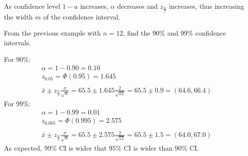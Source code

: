 \documentclass[letterpaper,12pt,fleqn]{article}
\renewcommand{\a}{\alpha}
\renewcommand{\o}{\sigma}
\newcommand{\z}[1]{z_{#1}}
\newcommand{\zdt}{\z{\frac{\a}{2}}}
\renewcommand{\P}{\Phi}
\begin{document}
As confidence level \(1-a\) increases, \(\a\) decreases and \(\zdt\) increases, thus increasing the width \(m\) of the
confidence interval.

\begin{example}
  From the previous example with \(n=12\), find the 90\% and 99\% confidence intervals.

  For 90\%:
  \begin{gather*}
    \a=1-0.90=0.10 \\
    \z{0.05}=\P(0.95)=1.645 \\
    \\
    \bar{x}\pm\zdt\frac{\o}{\sqrt{n}}=65.5\pm1.645\frac{2}{\sqrt{12}}=65.5\pm0.9=(64.6,66.4)
  \end{gather*}
  For 99\%:
  \begin{gather*}
    \a=1-0.99=0.01 \\
    \z{0.005}=\P(0.995)=2.575 \\
    \\
    \bar{x}\pm\zdt\frac{\o}{\sqrt{n}}=65.5\pm2.575\frac{2}{\sqrt{12}}=65.5\pm1.5=(64.0,67.0)
  \end{gather*}
  As expected, 99\% CI is wider that 95\% CI is wider than 90\% CI.
\end{example}
\end{document}
